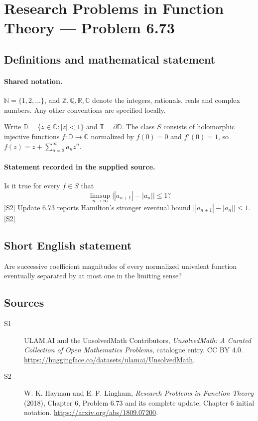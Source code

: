 \documentclass[11pt]{article}
\newcommand{\sref}[2]{\hyperlink{source:#1:#2}{[S#2]}}
\begin{document}
\section{Research Problems in Function Theory — Problem 6.73}\label{statement}

\subsection{Definitions and mathematical statement}

\paragraph{Shared notation.}$\mathbb N=\{1,2,\ldots\}$, and $\mathbb Z,\mathbb Q,\mathbb R,\mathbb C$ denote the integers, rationals, reals and complex numbers. Any other conventions are specified locally.


Write $\mathbb D=\{z\in\mathbb C:|z|<1\}$ and $\mathbb T=\partial\mathbb D$. The class $S$ consists of holomorphic injective functions $f:\mathbb D\to\mathbb C$ normalized by $f(0)=0$ and $f'(0)=1$, so $f(z)=z+\sum_{n=2}^{\infty}a_nz^n$.
\paragraph{Statement recorded in the supplied source.}
Is it true for every $f\in S$ that \[\limsup_{n\to\infty}\bigl||a_{n+1}|-|a_n|\bigr|\le1?\] \sref{statement}{2}
Update 6.73 reports Hamilton's stronger eventual bound $\bigl||a_{n+1}|-|a_n|\bigr|\le1$. \sref{statement}{2}
\subsection{Short English statement}
Are successive coefficient magnitudes of every normalized univalent function eventually separated by at most one in the limiting sense?
\subsection{Sources}
\begin{description}
\item[\hypertarget{source:statement:1}{S1}] ULAM.AI and the UnsolvedMath Contributors, \emph{UnsolvedMath: A Curated Collection of Open Mathematics Problems}, catalogue entry. CC BY 4.0. \url{https://huggingface.co/datasets/ulamai/UnsolvedMath}.
\item[\hypertarget{source:statement:2}{S2}] W. K. Hayman and E. F. Lingham, \emph{Research Problems in Function Theory} (2018), Chapter 6, Problem 6.73 and its complete update; Chapter 6 initial notation. \url{https://arxiv.org/abs/1809.07200}.
\end{description}
\label{end:statement}
\end{document}
